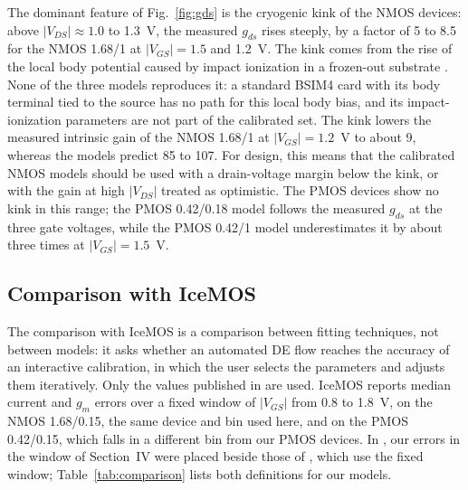 \documentclass[a4paper,10pt,twoside,twocolumn,final]{JICS_LaTexGuidelines} %
\begin{document}
The dominant feature of Fig.~\ref{fig:gds} is the cryogenic kink of the NMOS devices: above $|V_{DS}|\approx1.0$ to 1.3~V, the measured $g_{ds}$ rises steeply, by a factor of 5 to 8.5 for the NMOS 1.68/1 at $|V_{GS}|=1.5$ and 1.2~V. The kink comes from the rise of the local body potential caused by impact ionization in a frozen-out substrate \cite{b4}. None of the three models reproduces it: a standard BSIM4 card with its body terminal tied to the source has no path for this local body bias, and its impact-ionization parameters are not part of the calibrated set. The kink lowers the measured intrinsic gain of the NMOS 1.68/1 at $|V_{GS}|=1.2$~V to about 9, whereas the models predict 85 to 107. For design, this means that the calibrated NMOS models should be used with a drain-voltage margin below the kink, or with the gain at high $|V_{DS}|$ treated as optimistic. The PMOS devices show no kink in this range; the PMOS 0.42/0.18 model follows the measured $g_{ds}$ at the three gate voltages, while the PMOS 0.42/1 model underestimates it by about three times at $|V_{GS}|=1.5$~V.

\subsection{Comparison with IceMOS}

The comparison with IceMOS \cite{b6} is a comparison between fitting techniques, not between models: it asks whether an automated DE flow reaches the accuracy of an interactive calibration, in which the user selects the parameters and adjusts them iteratively. Only the values published in \cite{b6} are used. IceMOS reports median current and $g_m$ errors over a fixed window of $|V_{GS}|$ from 0.8 to 1.8~V, on the NMOS 1.68/0.15, the same device and bin used here, and on the PMOS 0.42/0.15, which falls in a different bin from our PMOS devices. In \cite{b17}, our errors in the window of Section~IV were placed beside those of \cite{b6}, which use the fixed window; Table~\ref{tab:comparison} lists both definitions for our models.
\end{document}
